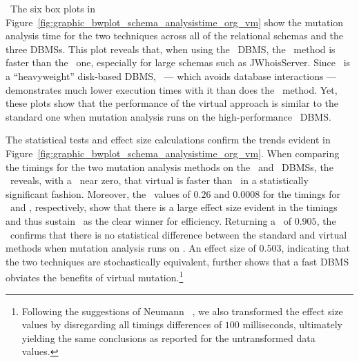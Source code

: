 

~The six box plots in Figure~\ref{fig:graphic_bwplot_schema_analysistime_org_vm} show the mutation analysis time for the two techniques across all of the relational schemas and the three DBMSs. This plot reveals that, when using the \HyperSQL~DBMS, the \virtual~method is faster than the \Original~one, especially for large schemas such as JWhoisServer. Since \Postgres~is a ``heavyweight'' disk-based DBMS, \vma~--- which avoids database interactions --- demonstrates much lower execution times with it than does the \Original~method. Yet, these plots show that the performance of the virtual approach is similar to the standard one when mutation analysis runs on the high-performance \sqlite~DBMS.


The statistical tests and effect size calculations confirm the trends evident in Figure~\ref{fig:graphic_bwplot_schema_analysistime_org_vm}. When comparing the timings for the two mutation analysis methods on the \HyperSQL~and \Postgres~DBMSs, the \wilcoxon~reveals, with a \pvalue~near zero, that virtual is faster than \Original~in a statistically significant fashion. Moreover, the \atwelve~values of $0.26$ and $0.0008$ for the timings for \HyperSQL~and \Postgres, respectively, show that there is a large effect size evident in the timings and thus sustain \vma~as the clear winner for efficiency. Returning a \pvalue~of $0.905$, the \wilcoxon~confirms that there is no statistical difference between the standard and virtual methods when mutation analysis runs on \sqlite. An effect size of $0.503$, indicating that the two techniques are stochastically equivalent, further shows that a fast DBMS obviates the benefits of virtual mutation.\footnote{{\scriptsize Following the suggestions of Neumann \etal~\cite{Neumann2015}, we also transformed the effect size values by disregarding all timings differences of $100$ milliseconds, ultimately yielding the same conclusions as reported for the untransformed data values.}}

